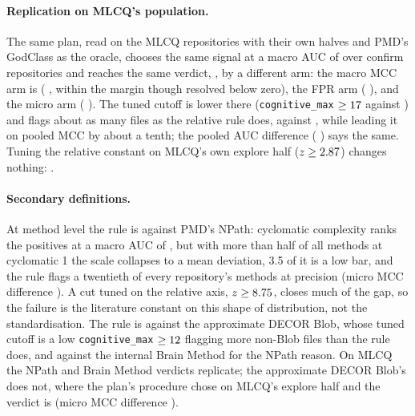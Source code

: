 \documentclass[11pt,a4paper]{article}
\newcommand{\sig}[1]{\texttt{#1}}
\begin{document}
\paragraph{Replication on MLCQ's population.} The same plan, read on the
\mlcqUsable{} MLCQ repositories with their own halves and PMD's GodClass as
the oracle, chooses the same signal at a macro AUC of \mlcqPmdAucMacro{}
\mlcqPmdAucMacroCI{} over \mlcqPmdAucMacroN{} confirm repositories and reaches
the same verdict, \textbf{\mlcqPmdVerdict}, by a different arm: the macro MCC
arm is \mlcqPmdMacroMccVerdict{} (\mlcqPmdMacroMcc{} \mlcqPmdMacroMccCI{},
within the margin though resolved below zero), the FPR arm
\mlcqPmdMacroFprVerdict{} (\mlcqPmdMacroFpr{} \mlcqPmdMacroFprCI{}), and the
micro arm \mlcqPmdMicroMccVerdict{} (\mlcqPmdMicroMcc{} \mlcqPmdMicroMccCI{}).
The tuned cutoff is lower there (\sig{cognitive\_max} $\geq 17$
against \primCut{}) and flags about as many files as the relative rule does,
\mlcqPmdAbsFprPct{} against \mlcqPmdRelFprPct{}, while leading it on pooled
MCC by about a tenth; the pooled AUC difference (\mlcqPmdPooledAucDiff{}
\mlcqPmdPooledAucDiffCI{}) says the same. Tuning the relative constant on
MLCQ's own explore half ($z \geq 2.87$) changes nothing:
\transferMlcqTunedMinusOwnVerdict{}.

\paragraph{Secondary definitions.} At method level the rule is
\textbf{\npathVerdict} against PMD's NPath: cyclomatic complexity ranks the
positives at a macro AUC of \npathAucMacro{}, but with more than half of all
methods at cyclomatic 1 the scale collapses to a mean deviation, 3.5 of it is
a low bar, and the rule flags a twentieth of every repository's methods at
precision \npathRelPrecision{} (micro MCC difference \npathMicroMcc{}
\npathMicroMccCI{}). A cut tuned on the relative axis, $z \geq 8.75$,
closes much of the gap, so the failure is the literature constant on this
shape of distribution, not the standardisation. The rule is
\textbf{\decorVerdict} against the approximate DECOR Blob, whose tuned cutoff
is a low \sig{cognitive\_max} $\geq 12$ flagging more non-Blob files
than the rule does, and \textbf{\brainVerdict} against the internal Brain
Method for the NPath reason. On MLCQ the NPath and Brain Method verdicts
replicate; the approximate DECOR Blob's does not, where the plan's procedure
chose \mlcqDecorSignal{} on MLCQ's explore half and the verdict is
\mlcqDecorVerdict{} (micro MCC difference \mlcqDecorMicroMcc{}
\mlcqDecorMicroMccCI{}).
\end{document}
